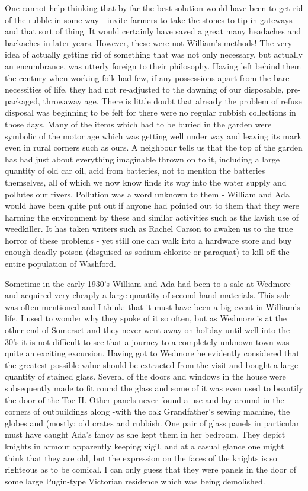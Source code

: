 One cannot help thinking that by far the best solution would have been to get rid of the rubble in some way - invite farmers to take the stones to tip in gateways and that sort of thing. It would certainly have saved a great many headaches and backaches in later years. However, these were not William's methods! The very idea of actually getting rid of something that was not only necessary, but actually an encumbrance, was utterly foreign to their philosophy. Having left behind them the century when working folk had few, if any possessions apart from the bare necessities of life, they had not re-adjusted to the dawning of our disposable, pre-packaged, throwaway age. There is little doubt that already the problem of refuse disposal was beginning to be felt for there were no regular rubbish collections in those days. Many of the items which had to be buried in the garden were symbolic of the motor age which was getting well under way and leaving its mark even in rural corners such as ours. A neighbour tells us that the top of the garden has had just about everything imaginable thrown on to it, including a large quantity of old car oil, acid from batteries, not to mention the batteries themselves, all of which we now know finds its way into the water supply and pollutes our rivers. Pollution was a word unknown to them - William and Ada would have been quite put out if anyone had pointed out to them that they were harming the environment by these and similar activities such as the lavish use of weedkiller. It has taken writers such as Rachel Carson to awaken us to the true horror of these problems - yet still one can walk into a hardware store and buy enough deadly poison (disguised as sodium chlorite or paraquat) to kill off the entire population of Washford.

Sometime in the early 1930's William and Ada had been to a sale at Wedmore and acquired very cheaply a large quantity of second hand materials. This sale was often mentioned and I think: that it must have been a big event in William's life. I used to wonder why they spoke of it so often, but as Wedmore is at the other end of Somerset and they never went away on holiday until well into the 30's it is not difficult to see that a journey to a completely unknown town was quite an exciting excursion. Having got to Wedmore he evidently considered that the greatest possible value should be extracted from the visit and bought a large quantity of stained glass. Several of the doors and windows in the house were subsequently made to fit round the glass and some of it was even used to beautify the door of the Toe H. Other panels never found a use and lay around in the corners of outbuildings along -with the oak Grandfather’s sewing machine, the globes and (mostly; old crates and rubbish. One pair of glass panels in particular must have caught Ada's fancy as she kept them in her bedroom. They depict knights in armour apparently keeping vigil, and at a casual glance one might think that they are old, but the expression on the faces of the knights is so righteous as to be comical. I can only guess that they were panels in the door of some large Pugin-type Victorian residence which was being demolished.

